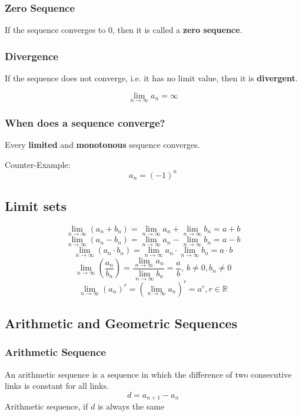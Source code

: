 \documentclass{book}
\begin{document}
\subsubsection{Zero Sequence}
If the sequence converges to $0$, then it is called a \textbf{zero sequence}.

\subsubsection{Divergence}
If the sequence does not converge, i.e. it has no limit value, then it is \textbf{divergent}.

\[
\lim\limits_{n\to \infty} a_{n} = \infty
\]

\subsubsection{When does a sequence converge?}
Every \textbf{limited} and \textbf{monotonous} sequence converges.

Counter-Example:
\[
  a_n = (-1)^n
\]

\subsection{Limit sets}
\[
\lim\limits_{n\to \infty} (a_{n} + b_{n}) = \lim\limits_{n\to \infty} a_{n} + \lim\limits_{n\to \infty} b_{n} = a + b
\]
\[
\lim\limits_{n\to \infty} (a_{n} - b_{n}) = \lim\limits_{n\to \infty} a_{n} - \lim\limits_{n\to \infty} b_{n} = a - b
\]
\[
\lim\limits_{n\to \infty} (a_{n} \cdot b_{n}) = \lim\limits_{n\to \infty} a_{n} \cdot \lim\limits_{n\to \infty} b_{n} = a \cdot b
\]
\[
\lim\limits_{n\to \infty}(\frac{a_{n}}{b_{n}}) = \frac{\lim\limits_{n\to \infty} a_{n}}{\lim\limits_{n\to \infty} b_{n}} = \frac{a}{b}, \: b \ne 0, b_{n} \ne 0
\]
\[
\lim\limits_{n\to\infty} (a_{n})^{r} = \left(\lim\limits_{n\to\infty}a_{n}\right)^{r} = a^{r}, r \in \mathbb{R}
\]

\subsection{Arithmetic and Geometric Sequences}
\subsubsection{Arithmetic Sequence}
An arithmetic sequence is a sequence in which the difference of two consecutive links is constant for all links.
\[
  d = a_{n+1} - a_{n}
\]
Arithmetic sequence, if $d$ is always the same
\end{document}
